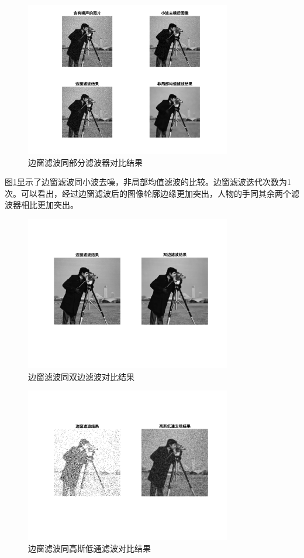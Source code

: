 \documentclass[conference]{IEEEtran}
\begin{document}
\begin{figure}[htbp]
	\centerline{
		\includegraphics[width=9cm]{compare.png} 	
	}
	\caption{边窗滤波同部分滤波器对比结果}
	\label{pic8}
\end{figure}
图\ref{pic8}显示了边窗滤波同小波去噪，非局部均值滤波的比较。边窗滤波迭代次数为1次。可以看出，经过边窗滤波后的图像轮廓边缘更加突出，人物的手同其余两个滤波器相比更加突出。

\begin{figure}[htbp]
	\centerline{
		\includegraphics[width=9cm]{SWBF_BF.png} 	
	}
	\caption{边窗滤波同双边滤波对比结果}
	\label{pic9}
\end{figure}

\begin{figure}[htbp]
	\centerline{
		\includegraphics[width=9cm]{SWBF_GL.png} 	
	}
	\caption{边窗滤波同高斯低通滤波对比结果}
	\label{pic10}
\end{figure}
\end{document}
